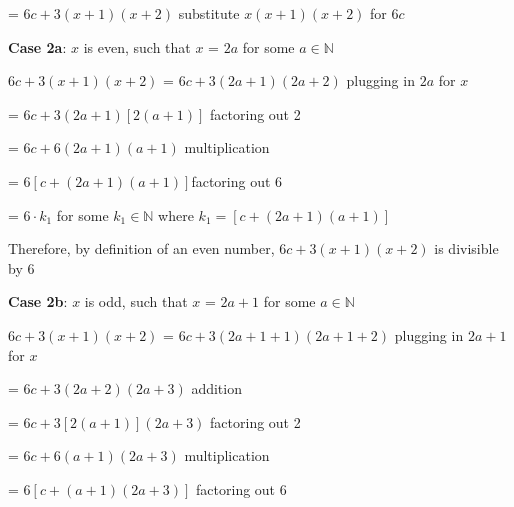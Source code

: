 \documentclass{article} %
\begin{document}
    \tabto*{3.51cm} = $6c + 3(x+1)(x+2)$ \tabto*{9.6cm}substitute $x(x+1)(x+2)$ for $6c$
    \vspace*{0.08cm}

    \tabto*{2cm} \textbf{Case 2a}: $x$ is even, such that $x$ = $2a$ for some $a \in \mathbb{N}$
    \vspace*{0.08cm}

    \tabto*{2cm} $6c + 3(x+1)(x+2)$ = $6c + 3(2a + 1)(2a + 2)$ \tabto*{9.5cm}plugging in $2a$ for $x$
    \vspace*{0.08cm}

    \tabto*{5.24cm} = $6c + 3(2a + 1)[2(a + 1)]$ \tabto*{9.5cm}factoring out 2
    \vspace*{0.08cm}

    \tabto*{5.24cm} = $6c + 6(2a + 1)(a + 1)$ \tabto*{9.5cm}multiplication
    \vspace*{0.08cm}
    
    \tabto*{5.24cm} = $6[c + (2a + 1)(a + 1)]$\tabto*{9.5cm}factoring out 6
    \vspace*{0.08cm}

    \tabto*{5.24cm} = $6 \cdot k_{1}$ for some $k_{1} \in \mathbb{N}$ where $k_{1} = [c + (2a + 1)(a + 1)]$


    \tabto*{2cm} Therefore, by definition of an even number, $6c + 3(x+1)(x+2)$ is divisible by 6
    \vspace*{0.3cm}

    \tabto*{2cm} \textbf{Case 2b}: $x$ is odd, such that $x$ = $2a + 1$ for some $a \in \mathbb{N}$
    \vspace*{0.08cm}

    \tabto*{2cm} $6c + 3(x+1)(x+2)$ = $6c + 3(2a+1 + 1)(2a+1 + 2)$ \tabto*{10.4cm}plugging in $2a+1$ for $x$
    \vspace*{0.08cm}

    \tabto*{5.24cm} = $6c + 3(2a+2)(2a+3)$ \tabto*{10.4cm}addition
    \vspace*{0.08cm}

    \tabto*{5.24cm} = $6c + 3[2(a+1)](2a+3)$ \tabto*{10.4cm}factoring out 2
    \vspace*{0.08cm}

    \tabto*{5.24cm} = $6c + 6(a+1)(2a+3)$ \tabto*{10.4cm}multiplication
    \vspace*{0.08cm}

    \tabto*{5.24cm} = $6[c + (a+1)(2a+3)]$ \tabto*{10.4cm}factoring out 6
    \vspace*{0.08cm}
    
\end{document}
